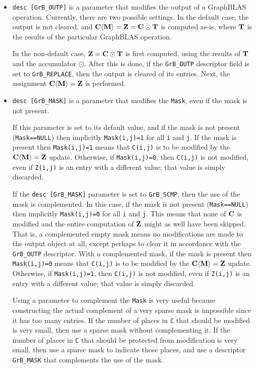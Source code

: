 \documentclass[12pt]{article}
\begin{document}
\begin{itemize}
\item \verb'desc [GrB_OUTP]' is a parameter that modifies the output of a
    GraphBLAS operation.  Currently, there are two possible settings.  In the
    default case, the output is not cleared, and ${\bf C \langle M \rangle = Z
    = C \odot T}$ is computed as-is, where ${\bf T}$ is the results of the
    particular GraphBLAS operation.

    In the non-default case, ${\bf Z = C \odot T}$ is first computed, using the
    results of ${\bf T}$ and the accumulator $\odot$.  After this is done, if
    the \verb'GrB_OUTP' descriptor field is set to \verb'GrB_REPLACE', then the
    output is cleared of its entries.  Next, the assignment ${\bf C \langle M
    \rangle = Z}$ is performed.

\item \verb'desc [GrB_MASK]' is a parameter that modifies the \verb'Mask',
    even if the mask is not present.

    If this parameter is set to its default value, and if the mask is not
    present (\verb'Mask==NULL') then implicitly \verb'Mask(i,j)=1' for all
    \verb'i' and \verb'j'.  If the mask is present then \verb'Mask(i,j)=1'
    means that \verb'C(i,j)' is to be modified by the ${\bf C \langle M \rangle
    = Z}$ update.  Otherwise, if \verb'Mask(i,j)=0', then \verb'C(i,j)' is not
    modified, even if \verb'Z(i,j)' is an entry with a different value; that
    value is simply discarded.

    If the \verb'desc [GrB_MASK]' parameter is set to \verb'GrB_SCMP', then the
    use of the mask is complemented.  In this case, if the mask is not present
    (\verb'Mask==NULL') then implicitly \verb'Mask(i,j)=0' for all \verb'i' and
    \verb'j'.  This means that none of ${\bf C}$ is modified and the entire
    computation of ${\bf Z}$ might as well have been skipped.  That is, a
    complemented empty mask means no modifications are made to the output
    object at all, except perhaps to clear it in accordance with the
    \verb'GrB_OUTP' descriptor.  With a complemented mask, if the mask is
    present then \verb'Mask(i,j)=0' means that \verb'C(i,j)' is to be modified
    by the ${\bf C \langle M \rangle = Z}$ update.  Otherwise, if
    \verb'Mask(i,j)=1', then \verb'C(i,j)' is not modified, even if
    \verb'Z(i,j)' is an entry with a different value; that value is simply
    discarded.

    Using a parameter to complement the \verb'Mask' is very useful because
    constructing the actual complement of a very sparse mask is impossible
    since it has too many entries.  If the number of places in \verb'C'
    that should be modified is very small, then use a sparse mask without
    complementing it.  If the number of places in \verb'C' that should
    be protected from modification is very small, then use a sparse mask
    to indicate those places, and use a descriptor \verb'GrB_MASK' that
    complements the use of the mask.


\end{itemize}
\end{document}
